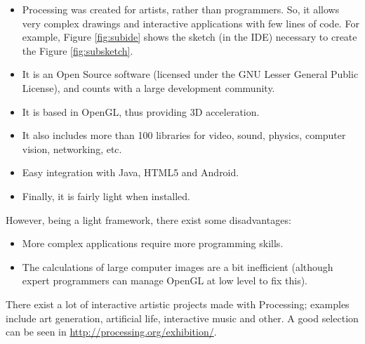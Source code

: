 \documentclass[a4paper,twoside]{article}
\begin{document}
\begin{itemize}
\item Processing was created for artists, rather than programmers. So, it allows very complex drawings and interactive applications with few lines of code. For example, Figure \ref{fig:subide} shows the sketch (in the IDE) necessary to create the Figure \ref{fig:subsketch}.
\item It is an Open Source software (licensed under the GNU Lesser General Public License), and counts with a large development community.
\item It is based in OpenGL, thus providing 3D acceleration.
\item It also includes more than 100 libraries for video, sound, physics, computer vision, networking, etc.
\item Easy integration with Java, HTML5 and Android.
\item Finally, it is fairly light when installed.
\end{itemize}




However, being a light framework, there exist some disadvantages:
\begin{itemize}
\item More complex applications require more programming skills.
\item The calculations of large computer images are a bit inefficient (although expert programmers can manage OpenGL at low level to fix this).
\end{itemize}

There exist a lot of interactive artistic projects made with Processing; examples include art generation, artificial life, interactive music and other. A good selection can be seen in \url{http://processing.org/exhibition/}.

\end{document}
